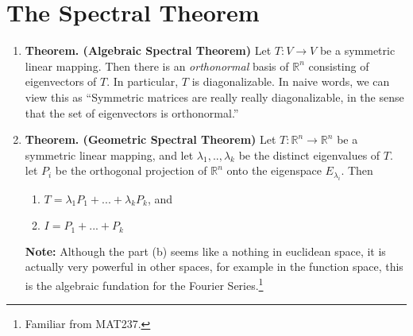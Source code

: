 \documentclass[oneside, 12pt]{book}
\newcommand{\settag}[1]{\renewcommand{\theenumi}{#1}}
\newcommand{\R}{\mathbb{R}}
\newcommand{\real}{\mathbb{R}}
\newcommand{\tbf}[1]{\textbf{#1}}
\newcommand{\trans}[3]{$#1:#2\rightarrow{}#3$}
\newcommand{\para}[1]{\item \tbf{#1}}
\begin{document}
\section{The Spectral Theorem}
\begin{enumerate}
    \settag{4.6.1}
    \para{Theorem. (Algebraic Spectral Theorem)} Let \trans{T}{V}{V} be a symmetric linear mapping. Then there is 
    an \textit{orthonormal} basis of $\R^n$ consisting of eigenvectors of $T$. In particular, 
    $T$ is diagonalizable. In naive words, we can view this as ``Symmetric matrices are really really
    diagonalizable, in the sense that the set of eigenvectors is orthonormal.''
    
    \settag{4.6.3}
    \para{Theorem. (Geometric Spectral Theorem)} Let \trans{T}{\R^n}{\R^n} be a symmetric linear mapping, and let 
    $\lambda_1,..,\lambda_k$ be the distinct eigenvalues of $T$. let $P_i$ be the 
    orthogonal projection of $\R^n$ onto the eigenspace $E_{\lambda_i}$. Then
    \begin{enumerate}
        \item $T = \lambda_1P_1+...+\lambda_k P_k$, and
        \item $I = P_1+...+P_k$
    \end{enumerate}
    \textbf{Note:} Although the part (b) seems like a nothing in euclidean space, it is 
    actually very powerful in other spaces, for example in the function space, this is 
    the algebraic fundation for the Fourier Series.\footnote{Familiar from MAT237.}



\end{enumerate}
\end{document}
